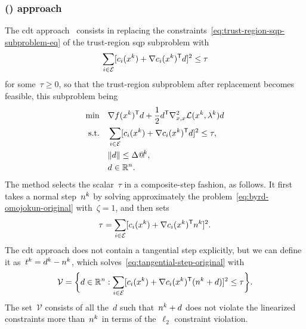 \subsubsection{ () approach}

The \gls{cdt} approach~\cite{Celis_1985,Celis_Dennis_Tapia_1985} consists in replacing the constraints~\cref{eq:trust-region-sqp-subproblem-eq} of the trust-region \gls{sqp} subproblem with
\begin{equation*}
    \sum_{i \in \ieq} [\con{i}(\iter[k]) + \nabla \con{i}(\iter[k])^{\T} \step]^2 \le \tau
\end{equation*}
for some~$\tau \ge 0$, so that the trust-region subproblem after replacement becomes feasible, this subproblem being
\begin{subequations}
    \label{eq:cdt-composite-step-original}
    \begin{align}
        \min        & \quad \nabla \obj(\iter[k])^{\T} \step + \frac{1}{2} \step^{\T} \nabla_{x, x}^2 \lag(\iter[k], \lm[k]) \step\\
        \text{s.t.} & \quad \sum_{i \in \ieq} [\con{i}(\iter[k]) + \nabla \con{i}(\iter[k])^{\T} \step]^2 \le \tau, \label{eq:cdt-composite-step-original-eq}\\
                    & \quad \norm{\step} \le \rad[k], \label{eq:cdt-composite-step-original-tr}\\
                    & \quad \step \in \R^n. \nonumber
    \end{align}
\end{subequations}
The method selects the scalar~$\tau$ in a composite-step fashion, as follows.
It first takes a normal step~$\nstep[k]$ by solving approximately the problem~\cref{eq:byrd-omojokun-original} with~$\zeta = 1$, and then sets
\begin{equation*}
    \tau = \sum_{i \in \ieq} [\con{i}(\iter[k]) + \nabla \con{i}(\iter[k])^{\T} \nstep[k]]^2.
\end{equation*}
The \gls{cdt} approach does not contain a tangential step explicitly, but we can define it as~$\tstep[k] = \step[k] - \nstep[k]$, which solves~\cref{eq:tangential-step-original} with
\begin{equation*}
    \mathcal{V} = \set[\bigg]{d \in \R^n : \sum_{i \in \ieq} [\con{i}(\iter[k]) + \nabla \con{i}(\iter[k])^{\T} (\nstep[k] + \step)]^2 \le \tau}.
\end{equation*}
The set~$\mathcal{V}$ consists of all the~$d$ such that~$\nstep[k] + d$ does not violate the linearized constraints more than~$\nstep[k]$ in terms of the~$\ell_2$ constraint violation.

